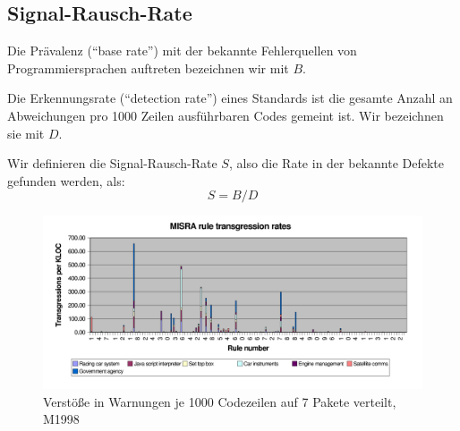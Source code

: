 \documentclass[a4paper,UKenglish,cleveref, autoref]{templates/lipics-v2019}
\begin{document}
    \subsection{Signal-Rausch-Rate}
    \label{subsec:signal-rausch-rate}

    \begin{definition}
        Die Prävalenz (\enquote{base rate}) mit der bekannte Fehlerquellen von Programmiersprachen auftreten bezeichnen wir mit $B$.
    \end{definition}

    \begin{definition}
        Die Erkennungsrate (\enquote{detection rate}) eines Standards ist die gesamte Anzahl an Abweichungen pro 1000 Zeilen
        ausführbaren Codes gemeint ist.
        Wir bezeichnen sie mit $D$.
    \end{definition}
    
    \begin{definition}
        Wir definieren die Signal-Rausch-Rate $S$, also die Rate in der bekannte Defekte gefunden werden, als:
        \begin{equation*}
            S=B/D
        \end{equation*}
    \end{definition}

    \begin{figure}[H]
        \centering
        \captionsetup{justification=centering,margin=2cm}
        \includegraphics[width=\textwidth]{graphics/1998-transgression-rates.png}
        \caption{Verstöße in Warnungen je 1000 Codezeilen auf 7 Pakete verteilt, M1998\cite{hatton2007language}}
    \end{figure}
\end{document}
